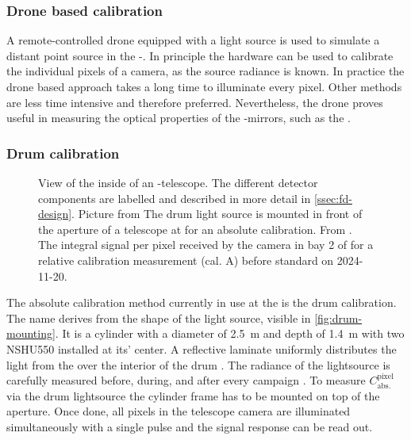 \subsubsection{Drone based calibration}

A remote-controlled drone equipped with a light source is used to simulate a 
distant point source in the \FD-\FOV \cite{wernerDesignTestFlying2010, 
tomankovaOpticalPropertiesCalibration2016}. In principle the hardware can be
used to calibrate the individual pixels of a camera, as the source radiance is
known. In practice the drone based approach takes a long time to illuminate 
every pixel. Other methods are less time intensive and therefore preferred. 
Nevertheless, the drone proves useful in measuring the optical properties of 
the \FD-mirrors, such as the \PSF.

\subsubsection{Drum calibration}

\begin{figure}[t]
  \centering
  \hspace{0.1cm}
  \hspace{0.1cm}
  \caption[]{ View of the inside of an \FD-telescope.
  The different detector components are labelled and described in more detail in
  \cref{ssec:fd-design}. Picture from \cite{pierreaugerobservatoryP22500022004} 
   The drum light source is mounted in front of the 
  aperture of a telescope at \CO for an absolute calibration. From 
  \cite{crissUpdateRecentAbsolute2010}.  The 
  integral signal per pixel received by the camera in bay 2 of \CO for a 
  relative calibration measurement (cal. A) before standard \DAQ on 2024-11-20.}
  \label{fig:camera-stuff}
\end{figure}

The absolute calibration method currently in use at the \PAO is the drum 
calibration. The name derives from the shape of the light source, visible in 
\cref{fig:drum-mounting}. It is a cylinder with a diameter of \SI{2.5}{\meter} 
and depth of \SI{1.4}{\meter} with two NSHU550 \UV \LEDs installed at its' 
center. A reflective laminate uniformly distributes the light from the \LED over
the interior of the drum \cite{brackAbsolutePhotometricCalibration2004}. The 
radiance of the lightsource is carefully measured before, during, and after 
every \DAQ campaign \cite{brackAugerFluorescenceDetector2013}. To measure 
$C^\mathrm{pixel}_\mathrm{abs.}$ via the drum lightsource the cylinder frame has
to be mounted on top of the \FD aperture. Once done, all pixels in the telescope
camera are illuminated simultaneously with a single \LED pulse and the signal
response can be read out.

